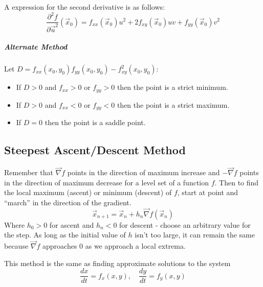 \documentclass[11pt]{article}
\begin{document}
		A expression for the second derivative is as follows:
		\begin{equation}
			\frac{\partial^2 f}{\partial \vec{u}^2}(\vec{x}_0) = f_{xx}(\vec{x}_0)u^2 + 2f_{xy}(\vec{x}_0)uv + f_{yy}(\vec{x}_0)v^2
		\end{equation}
		
	\subparagraph{Alternate Method} Let $D = f_{xx}(x_0, y_0)f_{yy}(x_0, y_0) - f_{xy}^2 (x_0, y_0)$:
		\begin{itemize}
			\item If $D > 0$ and $f_{xx} > 0$ or $f_{yy} > 0$ then the point is a strict minimum.
			\item If $D > 0$ and $f_{xx} < 0$ or $f_{yy} < 0$ then the point is a strict maximum.
			\item If $D = 0$ then the point is a saddle point.
		\end{itemize}
		
	\subsection{Steepest Ascent/Descent Method}
		Remember that $\vec{\nabla} f$ points in the direction of maximum increase and $-\vec{\nabla} f$ points in the direction of maximum decrease for a level set of a function $f$. Then to find the local maximum (ascent) or minimum (descent) of $f$, start at point and ``march'' in the direction of the gradient.
		\begin{equation}
			\vec{x}_{n+1} = \vec{x}_n + h_n \vec{\nabla} f(\vec{x}_n)
		\end{equation}
		Where $h_0 > 0$ for ascent and $h_n < 0$ for descent - choose an arbitrary value for the step. As long as the initial value of $h$ isn't too large, it can remain the same because $\vec{\nabla} f$ approaches 0 as we approach a local extrema.
		
		This method is the same as finding approximate solutions to the system
		\begin{equation}
			\frac{dx}{dt} = f_x(x, y), \quad \frac{dy}{dt} = f_y(x, y)
		\end{equation}
		
\end{document}
